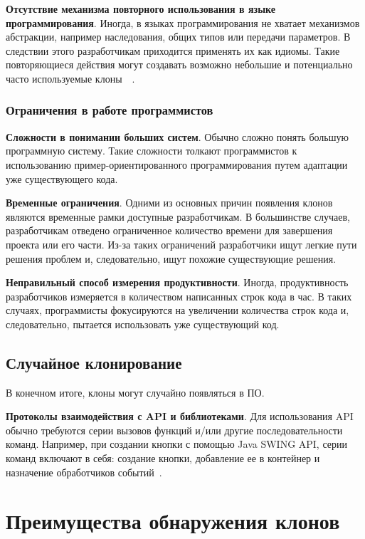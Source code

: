 \textbf{Отсутствие механизма повторного использования в языке программирования}. Иногда, в языках программирования не хватает механизмов абстракции, например наследования, общих типов или передачи параметров. В следствии этого разработчикам приходится применять их как идиомы. Такие повторяющиеся действия могут создавать возможно небольшие и потенциально часто используемые клоны~\cite{javasys}~\cite{templates}.

\subsubsection{Ограничения в работе программистов}

\textbf{Сложности в понимании больших систем}. Обычно сложно понять большую программную систему. Такие сложности толкают программистов к использованию пример-ориентированного программирования путем адаптации уже существующего кода.

\textbf{Временные ограничения}. Одними из основных причин появления клонов являются временные рамки доступные разработчикам. В большинстве случаев, разработчикам отведено ограниченное количество времени для завершения проекта или его части. Из-за таких ограничений разработчики ищут легкие пути решения проблем и, следовательно, ищут похожие существующие решения. 

\textbf{Неправильный способ измерения продуктивности}. Иногда, продуктивность разработчиков измеряется в количеством написанных строк кода в час. В таких случаях, программисты фокусируются на увеличении количества строк кода и, следовательно, пытается использовать уже существующий код.

\subsection{Случайное клонирование}

В конечном итоге, клоны могут случайно появляться в ПО.

\textbf{Протоколы взаимодействия с API и библиотеками}. Для использования API обычно требуются серии вызовов функций и/или другие последовательности команд. Например, при создании кнопки с помощью Java SWING API, серии команд включают в себя: создание кнопки, добавление ее в контейнер и назначение обработчиков событий~\cite{fingerprints}.

\section{Преимущества обнаружения клонов}


